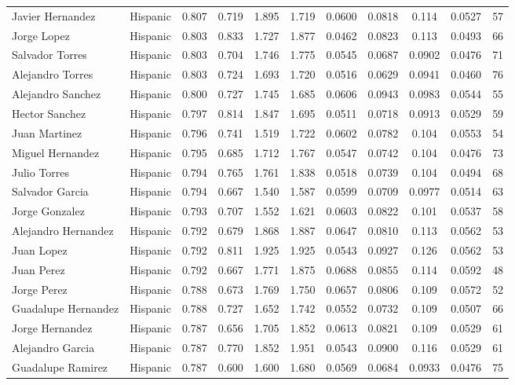 \documentclass[]{article}
\begin{document}
\begin{tabular}{lcccccccccc}
Javier Hernandez & Hispanic & 0.807 & 0.719 & 1.895 & 1.719 & 0.0600 & 0.0818 & 0.114 & 0.0527 & 57 \\
Jorge Lopez & Hispanic & 0.803 & 0.833 & 1.727 & 1.877 & 0.0462 & 0.0823 & 0.113 & 0.0493 & 66 \\
Salvador Torres & Hispanic & 0.803 & 0.704 & 1.746 & 1.775 & 0.0545 & 0.0687 & 0.0902 & 0.0476 & 71 \\
Alejandro Torres & Hispanic & 0.803 & 0.724 & 1.693 & 1.720 & 0.0516 & 0.0629 & 0.0941 & 0.0460 & 76 \\
Alejandro Sanchez & Hispanic & 0.800 & 0.727 & 1.745 & 1.685 & 0.0606 & 0.0943 & 0.0983 & 0.0544 & 55 \\
Hector Sanchez & Hispanic & 0.797 & 0.814 & 1.847 & 1.695 & 0.0511 & 0.0718 & 0.0913 & 0.0529 & 59 \\
Juan Martinez & Hispanic & 0.796 & 0.741 & 1.519 & 1.722 & 0.0602 & 0.0782 & 0.104 & 0.0553 & 54 \\
Miguel Hernandez & Hispanic & 0.795 & 0.685 & 1.712 & 1.767 & 0.0547 & 0.0742 & 0.104 & 0.0476 & 73 \\
Julio Torres & Hispanic & 0.794 & 0.765 & 1.761 & 1.838 & 0.0518 & 0.0739 & 0.104 & 0.0494 & 68 \\
Salvador Garcia & Hispanic & 0.794 & 0.667 & 1.540 & 1.587 & 0.0599 & 0.0709 & 0.0977 & 0.0514 & 63 \\
Jorge Gonzalez & Hispanic & 0.793 & 0.707 & 1.552 & 1.621 & 0.0603 & 0.0822 & 0.101 & 0.0537 & 58 \\
Alejandro Hernandez & Hispanic & 0.792 & 0.679 & 1.868 & 1.887 & 0.0647 & 0.0810 & 0.113 & 0.0562 & 53 \\
Juan Lopez & Hispanic & 0.792 & 0.811 & 1.925 & 1.925 & 0.0543 & 0.0927 & 0.126 & 0.0562 & 53 \\
Juan Perez & Hispanic & 0.792 & 0.667 & 1.771 & 1.875 & 0.0688 & 0.0855 & 0.114 & 0.0592 & 48 \\
Jorge Perez & Hispanic & 0.788 & 0.673 & 1.769 & 1.750 & 0.0657 & 0.0806 & 0.109 & 0.0572 & 52 \\
Guadalupe Hernandez & Hispanic & 0.788 & 0.727 & 1.652 & 1.742 & 0.0552 & 0.0732 & 0.109 & 0.0507 & 66 \\
Jorge Hernandez & Hispanic & 0.787 & 0.656 & 1.705 & 1.852 & 0.0613 & 0.0821 & 0.109 & 0.0529 & 61 \\
Alejandro Garcia & Hispanic & 0.787 & 0.770 & 1.852 & 1.951 & 0.0543 & 0.0900 & 0.116 & 0.0529 & 61 \\
Guadalupe Ramirez & Hispanic & 0.787 & 0.600 & 1.600 & 1.680 & 0.0569 & 0.0684 & 0.0933 & 0.0476 & 75 \\

\end{tabular}
\end{document}
